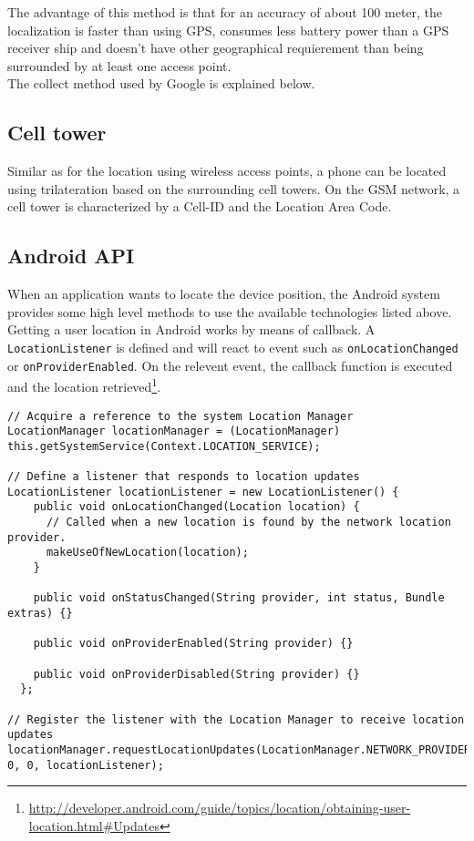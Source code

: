 \documentclass{report}
\begin{document}
The advantage of this method is that for an accuracy of about 100 meter, the localization is faster than using GPS, consumes less battery power than a GPS receiver ship and doesn't have other geographical requierement than being surrounded by at least one access point.\\

The collect method used by Google is explained below.

\subsection{Cell tower}
Similar as for the location using wireless access points, a phone can be located using trilateration based on the surrounding cell towers. On the GSM network, a cell tower is characterized by a Cell-ID and the Location Area Code.\\



\subsection{Android API}
When an application wants to locate the device position, the Android system provides some high level methods to use the available technologies listed above. Getting a user location in Android works by means of callback. A \texttt{LocationListener} is defined and will react to event such as \texttt{onLocationChanged} or \texttt{onProviderEnabled}. On the relevent event, the callback function is executed and the location retrieved\footnote{ \url{http://developer.android.com/guide/topics/location/obtaining-user-location.html#Updates}}.

\lstset{language=Java}
\begin{lstlisting}[label=location-base,caption=Code from Android developers guide]
// Acquire a reference to the system Location Manager
LocationManager locationManager = (LocationManager) this.getSystemService(Context.LOCATION_SERVICE);

// Define a listener that responds to location updates
LocationListener locationListener = new LocationListener() {
    public void onLocationChanged(Location location) {
      // Called when a new location is found by the network location provider.
      makeUseOfNewLocation(location);
    }

    public void onStatusChanged(String provider, int status, Bundle extras) {}

    public void onProviderEnabled(String provider) {}

    public void onProviderDisabled(String provider) {}
  };

// Register the listener with the Location Manager to receive location updates
locationManager.requestLocationUpdates(LocationManager.NETWORK_PROVIDER, 0, 0, locationListener);
\end{lstlisting}
  
\end{document}
